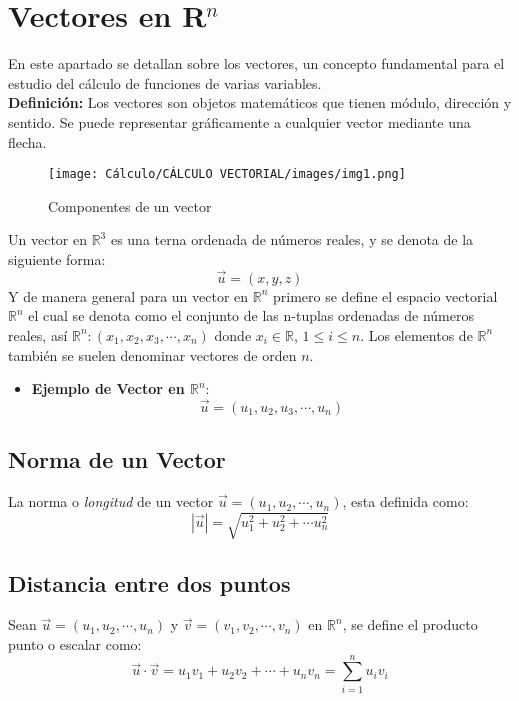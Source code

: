 \documentclass[../main]{subfiles}
\begin{document}
\chapter{Vectores en R$^n$}
En este apartado se detallan sobre los vectores, un concepto fundamental para el estudio del cálculo de funciones de varias variables. \\[0.2cm]
\textbf{Definición:} Los vectores son objetos matemáticos que tienen módulo, dirección y sentido. Se puede representar gráficamente a cualquier vector mediante una flecha.
\begin{figure}[h!]
    \centering
    \texttt{[image: Cálculo/CÁLCULO VECTORIAL/images/img1.png]}
    \caption{Componentes de un vector}
    \label{fig:my_label}
\end{figure}

Un vector en $\mathbb{R}^3$ es una terna ordenada de números reales, y se denota de la siguiente forma:
\begin{equation}
    \Vec{u}=(x,y,z)
\end{equation}
Y de manera general para un vector en $\mathbb{R}^n$ primero se define el espacio vectorial $\mathbb{R}^n$ el cual se denota como el conjunto de las n-tuplas ordenadas de números reales, así $\mathbb{R}^n:(x_1,x_2,x_3,\cdots,x_n)$ donde $x_i \in \mathbb{R}$, $1\leq i \leq n$. Los elementos de $\mathbb{R}^n$ también se suelen denominar vectores de orden $n$.
\begin{itemize}
    \item \textbf{Ejemplo de Vector en $\mathbb{R}^n:$}
        \begin{equation}
            \Vec{u}=(u_1,u_2,u_3,\cdots, u_n)
        \end{equation}
\end{itemize}
\section{Norma de un Vector}
La norma o \textit{longitud} de un vector $\Vec{u}=(u_1,u_2,\cdots, u_n)$, esta definida como:
\begin{equation}
    |\Vec{u}|=\sqrt{u_1^2+u_2^2+\cdots u_n^2}
\end{equation}
\section{Distancia entre dos puntos}
Sean $\Vec{u}=(u_1,u_2,\cdots, u_n)$ y $\Vec{v}=(v_1,v_2,\cdots, v_n)$ en $\mathbb{R}^n$, se define el producto punto o escalar como:
\begin{equation}
    \Vec{u} \cdot \Vec{v}=u_1 v_1+ u_2 v_2 +\cdots +u_n v_n=\sum_{i=1}^n u_i v_i
\end{equation}
\end{document}
